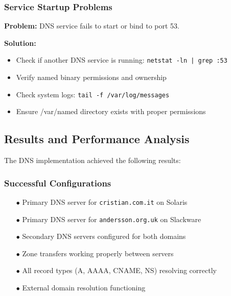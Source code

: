 \documentclass[12pt,a4paper]{article}
\begin{document}
\subsubsection{Service Startup Problems}
\begin{tcolorbox}[title=Issue: named service not starting]
\textbf{Problem:} DNS service fails to start or bind to port 53.

\textbf{Solution:}
\begin{itemize}
    \item Check if another DNS service is running: \texttt{netstat -ln | grep :53}
    \item Verify named binary permissions and ownership
    \item Check system logs: \texttt{tail -f /var/log/messages}
    \item Ensure /var/named directory exists with proper permissions
\end{itemize}
\end{tcolorbox}

\subsection{Results and Performance Analysis}\label{subsec:results}

The DNS implementation achieved the following results:

\subsubsection{Successful Configurations}
\begin{itemize}
    \item [$\bullet$] Primary DNS server for \texttt{cristian.com.it} on Solaris
    \item [$\bullet$] Primary DNS server for \texttt{andersson.org.uk} on Slackware
    \item [$\bullet$] Secondary DNS servers configured for both domains
    \item [$\bullet$] Zone transfers working properly between servers
    \item [$\bullet$] All record types (A, AAAA, CNAME, NS) resolving correctly
    \item [$\bullet$] External domain resolution functioning
\end{itemize}
\end{document}
